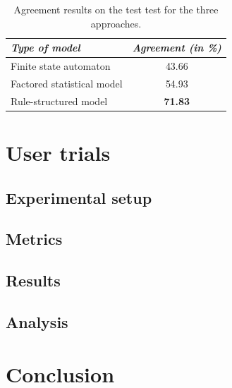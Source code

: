 \begin{table}[h]
\begin{center}
\begin{tabular}{|l|c|} \hline
\textit{Type of model} & \textit{Agreement (in \%) } \\ \hline \hline
Finite state automaton & 43.66 \\ \hline
Factored statistical model & 54.93 \\ \hline
Rule-structured model & \textbf{71.83} \\ \hline
\end{tabular}
\end{center}
\vspace{-2mm}
\caption{Agreement results on the test test for the three approaches.}
\vspace{-2mm}
\label{table:learning-exp3}
\end{table}

\section{User trials}

\subsection{Experimental setup}

\subsection{Metrics}




\subsection{Results}



\subsection{Analysis}

\section{Conclusion}




